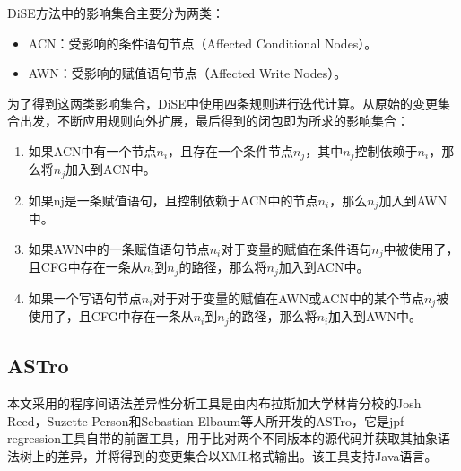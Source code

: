 DiSE方法中的影响集合主要分为两类：
\begin{itemize}
	\item ACN：受影响的条件语句节点（Affected Conditional Nodes）。
	\item AWN：受影响的赋值语句节点（Affected Write Nodes）。
\end{itemize}

为了得到这两类影响集合，DiSE中使用四条规则进行迭代计算。从原始的变更集合出发，不断应用规则向外扩展，最后得到的闭包即为所求的影响集合：
\begin{enumerate}
	\item 如果ACN中有一个节点$n_i$，且存在一个条件节点$n_j$，其中$n_j$控制依赖于$n_i$，那么将$n_j$加入到ACN中。
	\item 如果nj是一条赋值语句，且控制依赖于ACN中的节点$n_i$，那么$n_j$加入到AWN中。
	     
%	     
	\item 如果AWN中的一条赋值语句节点$n_i$对于变量的赋值在条件语句$n_j$中被使用了，且CFG中存在一条从$n_i$到$n_j$的路径，那么将$n_j$加入到ACN中。

	\item 如果一个写语句节点$n_i$对于对于变量的赋值在AWN或ACN中的某个节点$n_j$被使用了，且CFG中存在一条从$n_i$到$n_j$的路径，那么将$n_i$加入到AWN中。

\end{enumerate}



\subsection{ASTro}	

	本文采用的程序间语法差异性分析工具是由内布拉斯加大学林肯分校的Josh Reed，Suzette Person和Sebastian Elbaum等人所开发的ASTro，它是jpf-regression工具自带的前置工具，用于比对两个不同版本的源代码并获取其抽象语法树上的差异，并将得到的变更集合以XML格式输出。该工具支持Java语言。
	